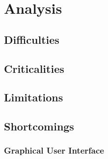 \chapter{Analysis}
\label{cha:analysis}


\section{Difficulties}
\label{sec:analysis_difficulties}

\section{Criticalities}
\label{sec:analysis_criticalities}

\section{Limitations}
\label{sec:analysis_limitations}

\section{Shortcomings}
\label{sec:analysis_shortcomings}

\subsection{Graphical User Interface}
\label{subsec:analysis_shortcomings_graphical_user_interface}